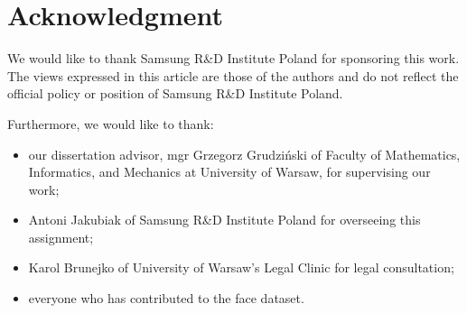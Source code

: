 \section*{Acknowledgment}
We would like to thank Samsung R\&D Institute Poland for sponsoring this work.
The views expressed in this article are those of the authors and do not reflect
the official policy or position of Samsung R\&D Institute Poland.

\bigskip \noindent
Furthermore, we would like to thank:
\begin{itemize}
    \item our dissertation advisor,  mgr Grzegorz Grudziński of Faculty of Mathematics,
          Informatics, and Mechanics at University of Warsaw, for supervising our work;
    \item Antoni Jakubiak of Samsung R\&D Institute Poland for overseeing this assignment;
    \item Karol Brunejko of University of Warsaw's Legal Clinic for legal consultation;
    \item everyone who has contributed to the face dataset.
\end{itemize}
